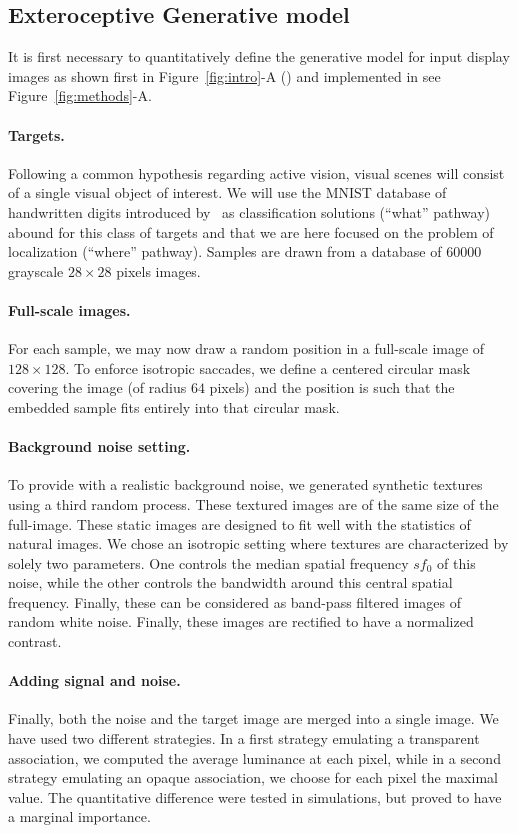 \subsection{Exteroceptive Generative model}
It is first necessary to quantitatively define the generative model for input display images as shown first in Figure~\ref{fig:intro}-A (\DIS ) and implemented in see Figure~\ref{fig:methods}-A. 

\paragraph{Targets.} Following a common hypothesis regarding active vision, visual scenes will consist of a single visual object of interest. We will use the MNIST database of handwritten digits introduced by~\citep{Lecun1998} as classification solutions (``what'' pathway) abound for this class of targets and that we are here focused on the problem of localization (``where'' pathway). Samples are drawn from a database of $60000$ grayscale $28\times 28$ pixels images. 
\paragraph{Full-scale images.} For each sample, we may now draw a random position in a full-scale image of $128\times 128$. To enforce isotropic saccades, we define a centered circular mask covering the image (of radius $64$ pixels) and the position is such that the embedded sample fits entirely into that circular mask.
\paragraph{Background noise setting. } To provide with a realistic background noise, we generated synthetic textures~\citep{Sanz12} using a third random process. These textured images are of the same size of the full-image. These static images are designed to fit well with the statistics of natural images. We chose an isotropic setting where textures are characterized by solely two parameters. One controls the median spatial frequency $sf_0$ of this noise, while the other controls the bandwidth around this central spatial frequency. Finally, these can be considered as band-pass filtered images of random white noise. Finally, these images are rectified to have a normalized contrast.
\paragraph{Adding signal and noise. } Finally, both the noise and the target image are merged into a single image. We have used two different strategies. In a first strategy emulating a transparent association, we computed the average luminance at each pixel, while in a second strategy emulating an opaque association, we choose for each pixel the maximal value.
The quantitative difference were tested in simulations, but proved to have a marginal importance.
